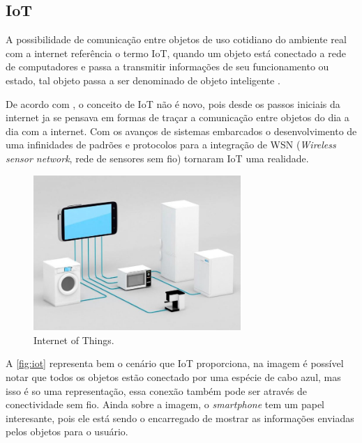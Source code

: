     \subsection{IoT}
    \par
    A possibilidade de comunicação entre objetos de uso cotidiano do ambiente real com a internet referência o termo IoT, quando um objeto está conectado a rede de computadores e passa a transmitir informações de seu funcionamento ou estado, tal objeto passa a ser denominado de objeto inteligente \cite{iot2016}.
    \par 
    De acordo com \citeauthor{iot2017}, o conceito de IoT não é novo, pois desde os passos iniciais da internet ja se 
    pensava em formas de traçar a comunicação entre objetos do dia a dia com a internet. Com os avanços de sistemas embarcados o 
    desenvolvimento de uma infinidades de padrões e protocolos para a integração de WSN (\textit{Wireless sensor network}, rede de sensores sem fio)  tornaram IoT uma realidade.
    \begin{figure}[H]
              \caption{\label{fig:iot}{Internet of Things.}}
              \centering
              \includegraphics[width=0.7\textwidth]{Figuras/iot.png}
        \end{figure}
    \par

    A \autoref{fig:iot} representa bem o cenário que IoT proporciona, na imagem é possível notar que todos os objetos estão conectado por 
    uma espécie de cabo azul, mas isso é so uma representação, essa conexão também pode ser através de conectividade sem fio. Ainda 
    sobre a imagem, o \textit{smartphone} tem um papel interesante, pois ele está sendo o encarregado de mostrar as informações enviadas 
    pelos objetos para o usuário.

